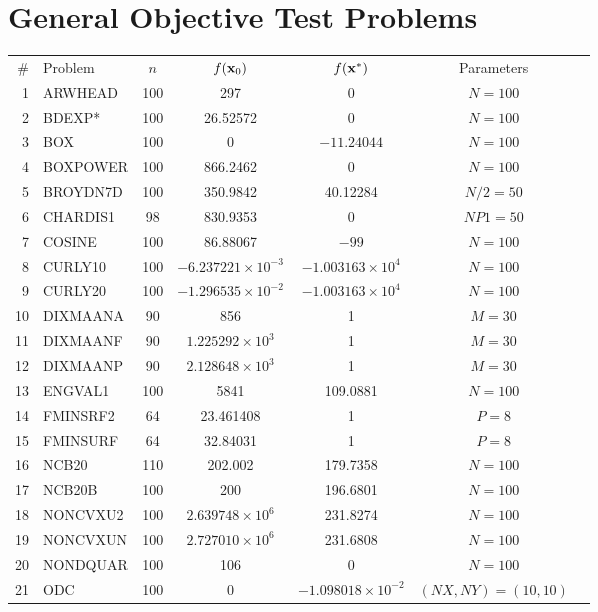 \section{General Objective Test Problems} \label{sec_genobj_problems}
\begin{table}[H]
	\centering
	\small{
	\begin{tabular}{rlccccc} %
		\hline\noalign{\smallskip}
		\# & Problem & $n$ & $f(\mathbf{x}_0)$ & $f(\mathbf{x}^*)$ & Parameters \\ \noalign{\smallskip}\hline\noalign{\smallskip} %
		1 & ARWHEAD & 100 & 297 & 0 & $N = 100$ \\
		2 & BDEXP* & 100 & 26.52572 & 0 & $N = 100$ \\
		3 & BOX & 100 & 0 & $-11.24044$ & $N = 100$ \\
		4 & BOXPOWER & 100 & 866.2462 & 0 & $N = 100$ \\
		5 & BROYDN7D & 100 & 350.9842 & 40.12284 & $N/2 = 50$ \\
		6 & CHARDIS1 & 98 & 830.9353 & 0 & $NP1 = 50$ \\
		7 & COSINE & 100 & 86.88067 & $-99$ & $N = 100$ \\
		8 & CURLY10 & 100 & $-6.237221\times 10^{-3}$ & $-1.003163\times 10^{4}$ & $N = 100$ \\
		9 & CURLY20 & 100 & $-1.296535\times 10^{-2}$ & $-1.003163\times 10^{4}$ & $N = 100$ \\
		10 & DIXMAANA & 90 & 856 & 1 & $M = 30$ \\
		11 & DIXMAANF & 90 & $1.225292\times 10^{3}$ & 1 & $M = 30$ \\
		12 & DIXMAANP & 90 & $2.128648\times 10^{3}$ & 1 & $M = 30$ \\
		13 & ENGVAL1 & 100 & 5841 & 109.0881 & $N = 100$ \\
		14 & FMINSRF2 & 64 & 23.461408 & 1 & $P = 8$ \\
		15 & FMINSURF & 64 & 32.84031 & 1 & $P = 8$ \\
		16 & NCB20 & 110 & 202.002 & 179.7358 & $N = 100$ \\
		17 & NCB20B & 100 & 200 & 196.6801 & $N = 100$ \\
		18 & NONCVXU2 & 100 & $2.639748\times 10^{6}$ & 231.8274 & $N = 100$ \\
		19 & NONCVXUN & 100 & $2.727010\times 10^{6}$ & 231.6808 & $N = 100$ \\
		20 & NONDQUAR & 100 & 106 & 0 & $N = 100$ \\
		21 & ODC & 100 & 0 & $-1.098018\times 10^{-2}$ & $(NX, NY) = (10, 10)$ \\

\end{tabular}}
\end{table}
